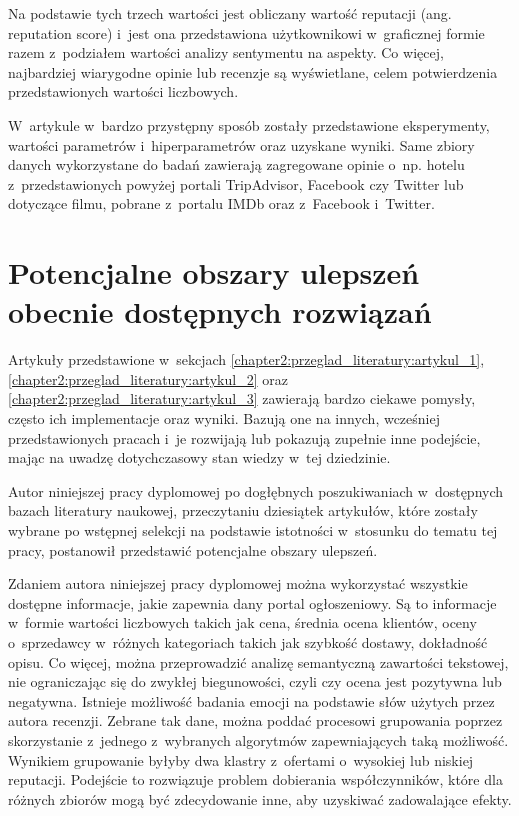 \documentclass[../Kamil_Kowalewski_Main.tex]{subfiles}
\begin{document}
{{        Na podstawie tych trzech wartości jest obliczany wartość reputacji (ang.
        reputation score) i~jest ona przedstawiona użytkownikowi w~graficznej formie
        razem z~podziałem wartości analizy sentymentu na aspekty. Co więcej,
        najbardziej wiarygodne opinie lub recenzje są wyświetlane, celem potwierdzenia
        przedstawionych wartości liczbowych.

        W~artykule w~bardzo przystępny sposób zostały przedstawione eksperymenty,
        wartości parametrów i~hiperparametrów oraz uzyskane wyniki. Same zbiory danych
        wykorzystane do badań zawierają zagregowane opinie o~np. hotelu
        z~przedstawionych powyżej portali TripAdvisor, Facebook czy Twitter lub
        dotyczące filmu, pobrane z~portalu IMDb oraz z~Facebook i~Twitter.

    }

    \section{Potencjalne obszary ulepszeń obecnie dostępnych rozwiązań}
    \label{chapter2:przeglad_literatury:ulepszenia} {
        Artykuły przedstawione w~sekcjach \ref{chapter2:przeglad_literatury:artykul_1},
        \ref{chapter2:przeglad_literatury:artykul_2} oraz
        \ref{chapter2:przeglad_literatury:artykul_3} zawierają bardzo ciekawe pomysły,
        często ich implementacje oraz wyniki. Bazują one na innych, wcześniej
        przedstawionych pracach i~je rozwijają lub pokazują zupełnie inne podejście,
        mając na uwadzę dotychczasowy stan wiedzy w~tej dziedzinie.

        Autor niniejszej pracy dyplomowej po dogłębnych poszukiwaniach w~dostępnych
        bazach literatury naukowej, przeczytaniu dziesiątek artykułów, które zostały
        wybrane po wstępnej selekcji na podstawie istotności w~stosunku do tematu tej
        pracy, postanowił przedstawić potencjalne obszary ulepszeń.

        Zdaniem autora niniejszej pracy dyplomowej można wykorzystać wszystkie dostępne
        informacje, jakie zapewnia dany portal ogłoszeniowy. Są to informacje
        w~formie wartości liczbowych takich jak cena, średnia ocena klientów, oceny
        o~sprzedawcy w~różnych kategoriach takich jak szybkość dostawy, dokładność
        opisu. Co więcej, można przeprowadzić analizę semantyczną zawartości tekstowej,
        nie ograniczając się do zwykłej biegunowości, czyli czy ocena jest
        pozytywna lub negatywna. Istnieje możliwość badania emocji na podstawie słów
        użytych przez autora recenzji. Zebrane tak dane, można poddać procesowi
        grupowania poprzez skorzystanie z~jednego z~wybranych algorytmów zapewniających
        taką możliwość. Wynikiem grupowanie byłyby dwa klastry z~ofertami o~wysokiej lub
        niskiej reputacji. Podejście to rozwiązuje problem dobierania współczynników,
        które dla różnych zbiorów mogą być zdecydowanie inne, aby uzyskiwać zadowalające
        efekty.

    }

}
\end{document}
